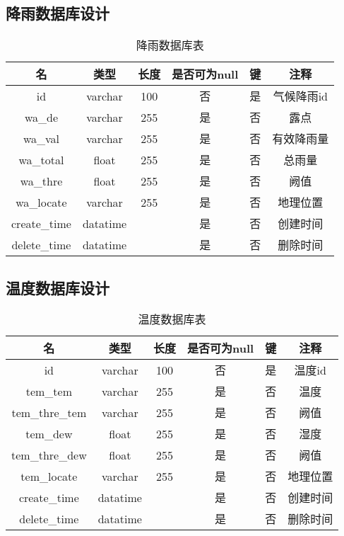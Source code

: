 \subsection{降雨数据库设计}
\begin{table}[H]
	\centering
	\caption[降雨数据]{降雨数据库表}
	\begin{tabular}{cccccc}
		\toprule
		名            & 类型      & 长度 &是否可为null & 键 & 注释\\
		\midrule
		id            & varchar  & 100  & 否 & 是 & 气候降雨id \\
		wa\_de     & varchar  & 255  &是  & 否 & 露点   \\
		wa\_val      & varchar  & 255  &是  & 否 & 有效降雨量   \\
		wa\_total   & float    & 255  &是  & 否 & 总雨量 \\
	    wa\_thre     & float    & 255  &是  & 否 & 阙值   \\
		wa\_locate   & varchar    & 255  & 是 & 否 & 地理位置     \\
		create\_time  & datatime &      &是  & 否 & 创建时间   \\
		delete\_time  &datatime  &      & 是 & 否 & 删除时间   \\ 
		\bottomrule
	\end{tabular}
\end{table}

\subsection{温度数据库设计}
\begin{table}[H]
	\centering
	\caption[温度数据]{温度数据库表}
	\begin{tabular}{cccccc}
		\toprule
		名            & 类型      & 长度 &是否可为null & 键 & 注释\\
		\midrule
		id            & varchar  & 100  & 否 & 是 & 温度id \\
		tem\_tem     & varchar  & 255  &是  & 否 & 温度   \\
		tem\_thre\_tem      & varchar  & 255  &是  & 否 & 阙值   \\
		tem\_dew   & float    & 255  &是  & 否 & 湿度 \\
		tem\_thre\_dew     & float    & 255  &是  & 否 & 阙值   \\
		tem\_locate   & varchar    & 255  & 是 & 否 & 地理位置     \\
		create\_time  & datatime &      &是  & 否 & 创建时间   \\
		delete\_time  &datatime  &      & 是 & 否 & 删除时间   \\ 
		\bottomrule
	\end{tabular}
\end{table}

